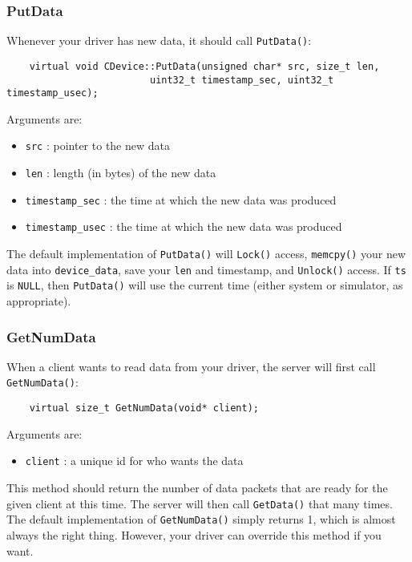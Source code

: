 \documentclass[11pt]{report}
\begin{document}
\subsubsection{PutData}
Whenever your driver has new data, it should call {\tt PutData()}:
\begin{verbatim}
    virtual void CDevice::PutData(unsigned char* src, size_t len,
                         uint32_t timestamp_sec, uint32_t timestamp_usec);
\end{verbatim}
Arguments are:
\begin{itemize}
\item {\tt src} : pointer to the new data
\item {\tt len} : length (in bytes) of the new data
\item {\tt timestamp\_sec} : the time at which the new data was produced
\item {\tt timestamp\_usec} : the time at which the new data was produced
\end{itemize}
The default implementation of {\tt PutData()} will {\tt Lock()} access,
{\tt memcpy()} your new data into {\tt device\_data}, save your {\tt len} and
timestamp,  and {\tt Unlock()} access.  If {\tt ts} is {\tt NULL}, then
{\tt PutData()} will use the current time (either system or simulator,
as appropriate).

\subsubsection{GetNumData}
When a client wants to read data from your driver, the server will first
call {\tt GetNumData()}:
\begin{verbatim}
    virtual size_t GetNumData(void* client);
\end{verbatim}
Arguments are:
\begin{itemize}
\item {\tt client} : a unique id for who wants the data
\end{itemize}
This method should return the number of data packets that are ready for the
given client at this time.  The server will then call {\tt GetData()} that
many times.  The default implementation of {\tt GetNumData()} simply returns
1, which is almost always the right thing.  However, your driver can override
this method if you want.
\end{document}
